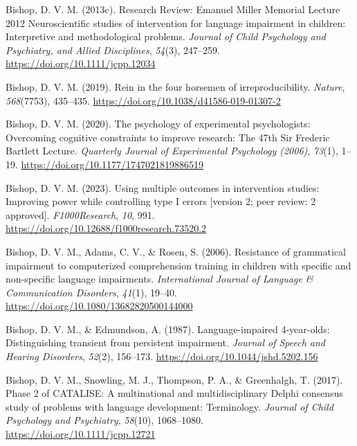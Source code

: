 \documentclass{krantz}
\newlength{\cslhangindent}
\newlength{\cslentryspacingunit} %
\newenvironment{CSLReferences}[2] %
{%
\setlength{\parindent}{0pt}
\ifodd #1
\let\oldpar\par
\def\par{\hangindent=\cslhangindent\oldpar}
\fi
\setlength{\parskip}{#2\cslentryspacingunit}
}%
{}
\begin{document}
\begin{CSLReferences}{1}{0}
\leavevmode{}%
Bishop, D. V. M. (2013c). Research {Review}: {Emanuel Miller Memorial Lecture} 2012 \textendash{} {Neuroscientific} studies of intervention for language impairment in children: Interpretive and methodological problems. \emph{Journal of Child Psychology and Psychiatry, and Allied Disciplines}, \emph{54}(3), 247--259. \url{https://doi.org/10.1111/jcpp.12034}

\leavevmode{}%
Bishop, D. V. M. (2019). Rein in the four horsemen of irreproducibility. \emph{Nature}, \emph{568}(7753), 435--435. \url{https://doi.org/10.1038/d41586-019-01307-2}

\leavevmode{}%
Bishop, D. V. M. (2020). The psychology of experimental psychologists: {Overcoming} cognitive constraints to improve research: {The} 47th {Sir Frederic Bartlett Lecture}. \emph{Quarterly Journal of Experimental Psychology (2006)}, \emph{73}(1), 1--19. \url{https://doi.org/10.1177/1747021819886519}

\leavevmode{}%
Bishop, D. V. M. (2023). Using multiple outcomes in intervention studies: Improving power while controlling type {I} errors {[}version 2; peer review: 2 approved{]}. \emph{F1000Research}, \emph{10}, 991. \url{https://doi.org/10.12688/f1000research.73520.2}

\leavevmode{}%
Bishop, D. V. M., Adams, C. V., \& Rosen, S. (2006). Resistance of grammatical impairment to computerized comprehension training in children with specific and non-specific language impairments. \emph{International Journal of Language \& Communication Disorders}, \emph{41}(1), 19--40. \url{https://doi.org/10.1080/13682820500144000}

\leavevmode{}%
Bishop, D. V. M., \& Edmundson, A. (1987). Language-impaired 4-year-olds: {Distinguishing} transient from persistent impairment. \emph{Journal of Speech and Hearing Disorders}, \emph{52}(2), 156--173. \url{https://doi.org/10.1044/jshd.5202.156}

\leavevmode{}%
Bishop, D. V. M., Snowling, M. J., Thompson, P. A., \& Greenhalgh, T. (2017). Phase 2 of {CATALISE}: A multinational and multidisciplinary {Delphi} consensus study of problems with language development: {Terminology}. \emph{Journal of Child Psychology and Psychiatry}, \emph{58}(10), 1068--1080. \url{https://doi.org/10.1111/jcpp.12721}


\end{CSLReferences}
\end{document}
